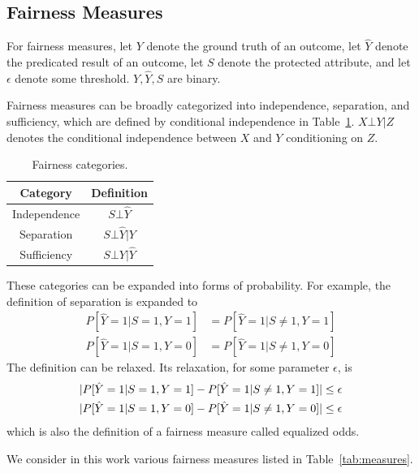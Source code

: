 \documentclass[manuscript,screen,review,anonymous]{acmart}
\DeclarePairedDelimiter{\abs}{\lvert}{\rvert}
\begin{document}
\subsection{Fairness Measures}

For fairness measures\cite{yuan2024ensuring,pessach2022review}, let $Y$ denote the ground truth of an outcome, let $\hat{Y}$ denote the predicated result of an outcome, let $S$ denote the protected attribute, and let $\epsilon$ denote some threshold. $Y, \hat{Y}, S$ are binary.

Fairness measures can be broadly categorized into independence, separation, and sufficiency, which are defined by conditional independence in Table~\ref{tab:categories}. $X \bot Y | Z$ denotes the conditional independence between $X$ and $Y$ conditioning on $Z$.

\begin{table}[h]
\caption{Fairness categories.}
\label{tab:categories}
\begin{tabular}{cc}
\toprule
\textbf{Category} & \textbf{Definition} \\
\midrule
Independence & $S \bot \hat{Y}$ \\
Separation & $S \bot \hat{Y} | Y$ \\
Sufficiency & $S \bot Y | \hat{Y}$ \\
\bottomrule
\end{tabular}
\end{table}

These categories can be expanded into forms of probability. For example, the definition of separation is expanded to
\begin{align*}
P[\hat{Y} = 1 | S = 1, Y = 1] & = P[\hat{Y} = 1 | S \neq 1, Y = 1] \\
P[\hat{Y} = 1 | S = 1, Y = 0] & = P[\hat{Y} = 1 | S \neq 1, Y = 0]
\end{align*}
The definition can be relaxed. Its relaxation, for some parameter $\epsilon$, is
\begin{align*}
\abs{P[\hat{Y} = 1 | S = 1, Y = 1] - P[\hat{Y} = 1 | S \neq 1, Y = 1]} & \leq \epsilon \\
\abs{P[\hat{Y} = 1 | S = 1, Y = 0] - P[\hat{Y} = 1 | S \neq 1, Y = 0]} & \leq \epsilon
\end{align*}
which is also the definition of a fairness measure called equalized odds.

We consider in this work various fairness measures listed in Table~\ref{tab:measures}.
\end{document}
